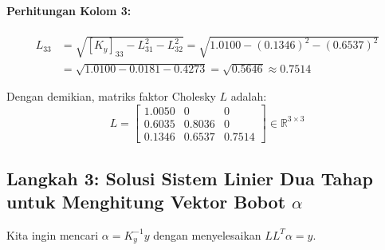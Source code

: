 \documentclass[11pt,a4paper]{article}
\def\boldsymbol#1{#1}%
\def\mathbf#1{#1}%
\begin{document}
\paragraph{Perhitungan Kolom 3:}
\begin{align*}
L_{33} &= \sqrt{[K_y]_{33} - L_{31}^2 - L_{32}^2} = \sqrt{1.0100 - (0.1346)^2 - (0.6537)^2} \\
&= \sqrt{1.0100 - 0.0181 - 0.4273} = \sqrt{0.5646} \approx \mathbf{0.7514}
\end{align*}

Dengan demikian, matriks faktor Cholesky $L$ adalah:
\begin{equation}
L = \begin{bmatrix}
1.0050 & 0 & 0 \\
0.6035 & 0.8036 & 0 \\
0.1346 & 0.6537 & 0.7514
\end{bmatrix} \in \mathbb{R}^{3 \times 3}
\end{equation}

\subsection{Langkah 3: Solusi Sistem Linier Dua Tahap untuk Menghitung Vektor Bobot \texorpdfstring{$\boldsymbol{\alpha}$}{alpha}}
Kita ingin mencari $\boldsymbol{\alpha} = K_y^{-1} \mathbf{y}$ dengan menyelesaikan $L L^T \boldsymbol{\alpha} = \mathbf{y}$.
\end{document}
